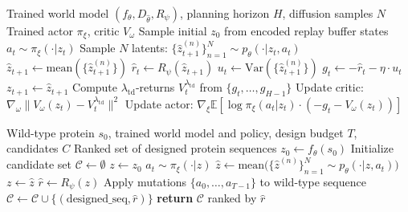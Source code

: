 \documentclass[12pt, a4paper]{article}
\begin{document}
\begin{algorithm}[H]
\caption{ProteinDreamer -- Imagination-Based Policy Training}
\label{alg:policy}
\begin{algorithmic}[1]
\REQUIRE Trained world model $(f_\theta, D_{\hat{\theta}}, R_\psi)$, planning horizon $H$, diffusion samples $N$
\ENSURE Trained actor $\pi_\xi$, critic $V_\omega$
\REPEAT
    \STATE Sample initial $z_0$ from encoded replay buffer states
        \STATE $a_t \sim \pi_\xi(\cdot | z_t)$ 
        \STATE Sample $N$ latents: $\{\hat{z}_{t+1}^{(n)}\}_{n=1}^N \sim p_\theta(\cdot | z_t, a_t)$ 
        \STATE $\hat{z}_{t+1} \leftarrow \text{mean}(\{\hat{z}_{t+1}^{(n)}\})$ 
        \STATE $\hat{r}_t \leftarrow R_\psi(\hat{z}_{t+1})$ 
        \STATE $u_t \leftarrow \text{Var}(\{\hat{z}_{t+1}^{(n)}\})$ 
        \STATE $g_t \leftarrow -\hat{r}_t - \eta \cdot u_t$ 
        \STATE $z_{t+1} \leftarrow \hat{z}_{t+1}$
    \ENDFOR
    \STATE Compute $\lambda_\text{td}$-returns $V_t^{\lambda_\text{td}}$ from $\{g_t, \ldots, g_{H-1}\}$
    \STATE Update critic: $\nabla_\omega \|V_\omega(z_t) - V_t^{\lambda_\text{td}}\|^2$
    \STATE Update actor: $\nabla_\xi \mathbb{E}[\log \pi_\xi(a_t|z_t) \cdot (-g_t - V_\omega(z_t))]$
\end{algorithmic}
\end{algorithm}

\begin{algorithm}[H]
\caption{ProteinDreamer -- Inference (Protein Design)}
\label{alg:inference}
\begin{algorithmic}[1]
\REQUIRE Wild-type protein $s_0$, trained world model and policy, design budget $T$, candidates $C$
\ENSURE Ranked set of designed protein sequences
\STATE $z_0 \leftarrow f_\theta(s_0)$ 
\STATE Initialize candidate set $\mathcal{C} \leftarrow \emptyset$
    \STATE $z \leftarrow z_0$
        \STATE $a_t \sim \pi_\xi(\cdot | z)$ 
        \STATE $\hat{z} \leftarrow \text{mean}\big(\{\hat{z}^{(n)}\}_{n=1}^N \sim p_\theta(\cdot | z, a_t)\big)$
        \STATE $z \leftarrow \hat{z}$
    \ENDFOR
    \STATE $\hat{r} \leftarrow R_\psi(z)$ 
    \STATE Apply mutations $\{a_0, \ldots, a_{T-1}\}$ to wild-type sequence
    \STATE $\mathcal{C} \leftarrow \mathcal{C} \cup \{(\text{designed\_seq}, \hat{r})\}$
\ENDFOR
\STATE \textbf{return} $\mathcal{C}$ ranked by $\hat{r}$ 
\end{algorithmic}
\end{algorithm}
\end{document}
